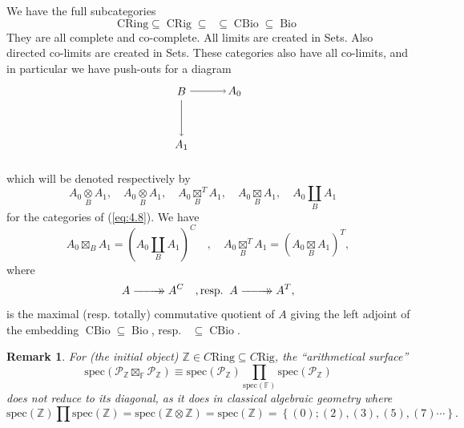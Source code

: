 \documentclass[leqno]{article}
\newcommand{\xtworightarrow}[2][]{%
				  \xrightarrow[#1]{#2}\mathrel{\mkern-14mu}\rightarrow
	}
\newcommand{\cring}{\text{CRing}}
\newcommand{\F}{\mathbb{F}}
\newcommand{\Z}{\mathbb{Z}}
\newcommand{\biop}{\mathscr{P}}
\DeclareMathOperator{\bio}{Bio}
\DeclareMathOperator{\cbio}{CBio}
\DeclareMathOperator{\ctbio}{C_TBio}
\DeclareMathOperator{\crig}{CRig}
\newtheorem{remark}[equation]{Remark}
\numberwithin{equation}{section}
\begin{document}
We have the full subcategories
\begin{equation}
				\cring\subseteq \crig \subseteq \ctbio \subseteq \cbio \subseteq \bio
				\label{eq:4.8}
\end{equation}
They are all complete and co-complete. All limits are created in Sets. Also directed co-limits
are created in Sets. These categories also have all co-limits, and in particular we have
push-outs for a diagram 
\begin{equation*}
				\begin{tikzpicture}[baseline=0mm, scale=1.4]
				 \coordinate (A1) at (5mm,5mm) ;
				 \coordinate (B0) at (5mm,13mm) ;
				 \coordinate (B1) at (7mm,15mm) ;
				 \coordinate (A0) at (15mm,15mm) ;
				 \draw[->] (B0)--(A1);
				 \draw[->] (B1)--(A0);
				 \node at (5mm,15mm) {$B$};
				 \node at (5mm,3mm) {$A_1$};
				 \node at (17mm,15mm) {$A_0$};
				\end{tikzpicture}
\end{equation*}
which will be denoted respectively by 
\begin{equation}
		A_0 \underset{B}{\otimes} A_1, \quad A_0 \underset{B}{\otimes} A_1, \quad A_0\underset{B}{\boxtimes}^{T}A_{1},\quad
	A_0\underset{B}{\boxtimes}A_1,\quad A_{0}\underset{B}{\amalg}A_1\quad %
	\label{eq:4.9}
\end{equation}
for the categories of (\ref{eq:4.8}). We have
\begin{equation}
A_0\boxtimes_BA_1=\left(A_0\underset{B}{\amalg}A_1\right)^C\quad , \quad
A_0\underset{B}{\boxtimes}^TA_1 = \left(A_0\underset{B}{\boxtimes}A_1\right)^T,
  \label{eq:4.10}
\end{equation}
where
\begin{equation}
				A\xtworightarrow{\qquad} A^{C}\quad , \text{resp.}\;\;
				A\xtworightarrow{\qquad}A^{T}, 
  \label{eq:4.11}
\end{equation}
is the maximal (resp. totally) commutative quotient of $A$ giving the left adjoint of the
embedding $\cbio\subseteq \bio$, resp. $\ctbio\subseteq \cbio$. 
\begin{remark}
				For (the initial object) $\Z\in C\text{Ring}\subseteq C\text{Rig}$, the
				``arithmetical surface''
				\begin{equation*}
          \text{spec}\left(\biop_{\Z}\boxtimes_{\F} \biop_{\Z}\right) \equiv
          \text{spec}\left( \biop_{\Z} \right)\prod\limits_{\text{spec}(\F)} \text{spec}\left( \biop_{\Z} \right)
				\end{equation*}
				does not reduce to its diagonal, as it does in classical algebraic geometry where 
				\begin{equation*}
								\text{spec}(\Z)\prod \text{spec}(\Z) = \text{spec}(\Z\otimes\Z) =
								\text{spec}(\Z) = \left\{ (0); (2),(3),(5),(7)\cdots \right\}.
				\end{equation*}
				\label{remark:7.9}
\end{remark}
\end{document}
